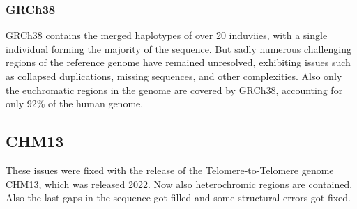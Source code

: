 \subsubsection{GRCh38}
GRCh38 contains the merged haplotypes of over 20 induviies, with a single individual forming the majority of the sequence. \cite{wang2022human}
But sadly numerous challenging regions of the reference genome have remained unresolved, exhibiting issues such as collapsed duplications, missing sequences, and other complexities. \cite{aganezov2022complete} Also only the euchromatic regions in the genome are covered by GRCh38, accounting for only 92\% of the human genome. \cite{nurk2022complete}
\subsection{CHM13}
These issues were fixed with the release of the Telomere-to-Telomere genome CHM13, which was released 2022. Now also heterochromic regions are contained. Also the last gaps in the sequence got filled and some structural errors got fixed. \cite{aganezov2022complete}\cite{nurk2022complete}

\cite{}


